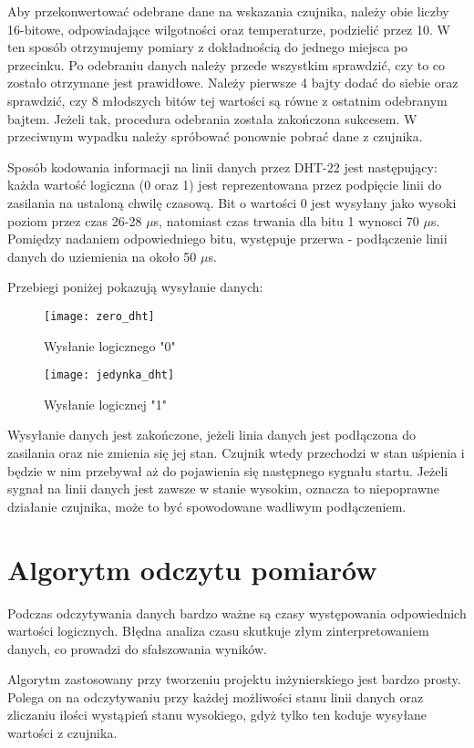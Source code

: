 Aby przekonwertować odebrane dane na wskazania czujnika, należy obie liczby 16-bitowe, odpowiadające wilgotności oraz temperaturze, podzielić przez 10. W ten sposób otrzymujemy pomiary z dokładnością do jednego miejsca po przecinku. Po odebraniu danych należy przede wszystkim sprawdzić, czy to co zostało otrzymane jest prawidłowe. Należy pierwsze 4 bajty dodać do siebie oraz sprawdzić, czy 8 młodszych bitów tej wartości są równe z ostatnim odebranym bajtem. Jeżeli tak, procedura odebrania została zakończona sukcesem. W przeciwnym wypadku należy spróbować ponownie pobrać dane z czujnika.

Sposób kodowania informacji na linii danych przez DHT-22 jest następujący: każda wartość logiczna (0 oraz 1) jest reprezentowana przez podpięcie linii do zasilania na ustaloną chwilę czasową. Bit o wartości 0 jest wysyłany jako wysoki poziom przez czas 26-28 $\mu$s, natomiast czas trwania dla bitu 1 wynosci 70 $\mu$s. Pomiędzy nadaniem odpowiedniego bitu, występuje przerwa - podłączenie linii danych do uziemienia na około 50 $\mu$s.

Przebiegi poniżej pokazują wysyłanie danych:
\begin{figure}[h]
\centering
\texttt{[image: zero\_dht]}
\caption{Wysłanie logicznego "0"}
\label{fig:zero_dht}
\end{figure}
\begin{figure}[h]
\centering
\texttt{[image: jedynka\_dht]}
\caption{Wysłanie logicznej "1"}
\label{fig:jedynka_dht}
\end{figure}

Wysyłanie danych jest zakończone, jeżeli linia danych jest podłączona do zasilania oraz nie zmienia się jej stan. Czujnik wtedy przechodzi w stan uśpienia i będzie w nim przebywał aż do pojawienia się następnego sygnału startu. Jeżeli sygnał na linii danych jest zawsze w stanie wysokim, oznacza to niepoprawne działanie czujnika, może to być spowodowane wadliwym podłączeniem. 

\section*{Algorytm odczytu pomiarów}
Podczas odczytywania danych bardzo ważne są czasy występowania odpowiednich wartości logicznych. Błędna analiza czasu skutkuje złym zinterpretowaniem danych, co prowadzi do sfałszowania wyników.

Algorytm zastosowany przy tworzeniu projektu inżynierskiego jest bardzo prosty. Polega on na odczytywaniu przy każdej możliwości stanu linii danych oraz zliczaniu ilości wystąpień stanu wysokiego, gdyż tylko ten koduje wysyłane wartości z czujnika.

